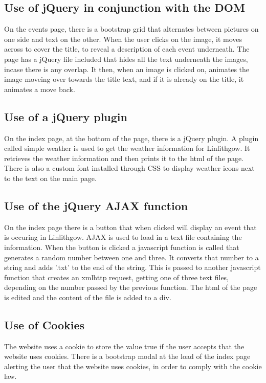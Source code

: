\documentclass[12pt,a4paper]{article}
\begin{document}
		\subsection{Use of jQuery in conjunction with the DOM}
		On the events page, there is a bootstrap grid that alternates between pictures on one side and text on the other. When the user clicks on the image, it moves across to cover the title, to reveal a description of each event underneath. The page has a jQuery file included that hides all the text underneath the images, incase there is any overlap. It then, when an image is clicked on, animates the image moveing over towards the title text, and if it is already on the title, it animates a move back.

		\subsection{Use of a jQuery plugin}
		On the index page, at the bottom of the page, there is a jQuery plugin. A plugin called simple weather is used to get the weather information for Linlithgow. It retrieves the weather information and then prints it to the html of the page. There is also a custom font installed through CSS to display weather icons next to the text on  the main page.

		\subsection{Use of the jQuery AJAX function}
		On the index page there is a button that when clicked will display an event that is occuring in Linlithgow. AJAX is used to load in a text file containing the information. When the button is clicked a javascript function is called that generates a random number between one and three. It converts that number to a string and adds '.txt' to the end of the string. This is passed to another javascript function that creates an xmlhttp request, getting one of three text files, depending on  the number passed by the previous function. The html of the page is edited and the content of the file is added to a div.

		\subsection{Use of Cookies}
		The website uses a cookie to store the value true if the user accepts that the website uses cookies. There is a bootstrap modal at the load of the index page alerting the user that the website uses cookies, in order to comply with the cookie law.
\end{document}
